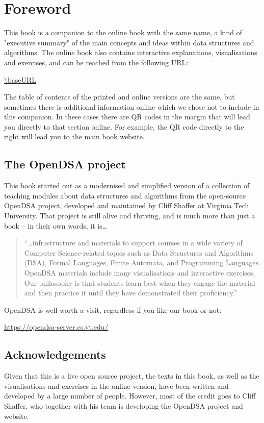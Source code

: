 \section*{Foreword}

This book is a companion to the online book with the same name, a kind of "executive summary" of the main concepts and ideas within data structures and algorithms.
The online book also contains interactive explanations, visualisations and exercises, and can be reached from the following URL:
\begin{center}
  \url{\baseURL}
\end{center}
The table of contents of the printed and online versions are the same, but sometimes there is additional information online which we chose not to include in this companion.
In these cases there are QR codes in the margin that will lead you directly to that section online.
For example, the QR code directly to the right will lead you to the main book website.


\subsection*{The OpenDSA project}

This book started out as a modernised and simplified version of a collection of teaching modules about data structures and algorithms from the open-source OpenDSA project, developed and maintained by Cliff Shaffer at Virginia Tech University.
That project is still alive and thriving, and is much more than just a book -- in their own words, it is\ldots

\begin{quotation}
  ``\ldots infrastructure and materials to support courses in a wide variety of Computer Science-related topics such as Data Structures and Algorithms (DSA), Formal Languages, Finite Automata, and Programming Languages.
  OpenDSA materials include many visualisations and interactive exercises. Our philosophy is that students learn best when they engage the material and then practice it until they have demonstrated their proficiency.''
\end{quotation}

OpenDSA is well worth a visit, regardless if you like our book or not:
\begin{center}
  \url{https://opendsa-server.cs.vt.edu/}
\end{center}

\subsection*{Acknowledgements}

Given that this is a live open source project, the texts in this book, as well as the visualisations and exercises in the online version, have been written and developed by a large number of people.
However, most of the credit goes to Cliff Shaffer, who together with his team is developing the OpenDSA project and website.

\newpage
